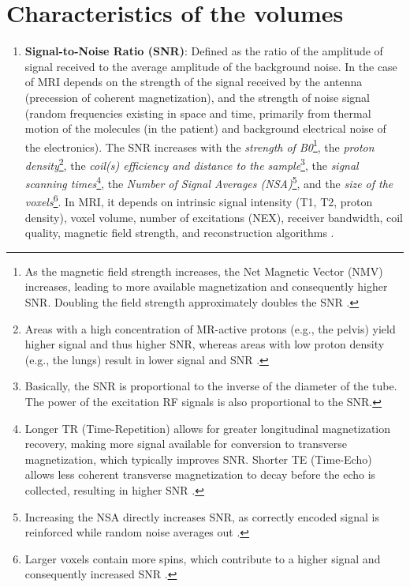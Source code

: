 \section{Characteristics of the volumes}
\begin{enumerate}
\item \textbf{Signal-to-Noise Ratio (SNR)}: Defined as the ratio of
  the amplitude of signal received to the average amplitude of the
  background noise. In the case of MRI depends on the strength of the
  signal received by the antenna (precession of coherent
  magnetization), and the strength of noise signal (random frequencies
  existing in space and time, primarily from thermal motion of the
  molecules (in the patient) and background electrical noise of the
  electronics). The SNR increases with the \emph{strength of
    B0}\footnote{As the magnetic field strength increases, the Net
    Magnetic Vector (NMV) increases, leading to more available
    magnetization and consequently higher SNR. Doubling the field
    strength approximately doubles the SNR \cite{westbrook2018mri}.},
  the \emph{proton density}\footnote{Areas with a high concentration
    of MR-active protons (e.g., the pelvis) yield higher signal and
    thus higher SNR, whereas areas with low proton density (e.g., the
    lungs) result in lower signal and SNR \cite{westbrook2018mri}.},
  the \emph{coil(s) efficiency and distance to the
    sample}\footnote{Basically, the SNR is proportional to the inverse
    of the diameter of the tube. The power of the excitation RF
    signals is also proportional to the SNR.}, the \emph{signal
    scanning times}\footnote{Longer TR (Time-Repetition) allows for
    greater longitudinal magnetization recovery, making more signal
    available for conversion to transverse magnetization, which
    typically improves SNR. Shorter TE (Time-Echo) allows less
    coherent transverse magnetization to decay before the echo is
    collected, resulting in higher SNR \cite{westbrook2018mri}.}, the
  \emph{Number of Signal Averages (NSA)}\footnote{Increasing the NSA
    directly increases SNR, as correctly encoded signal is reinforced
    while random noise averages out \cite{westbrook2018mri}.}, and the
  \emph{size of the voxels}\footnote{Larger voxels contain more spins,
    which contribute to a higher signal and consequently increased SNR
    \cite{westbrook2018mri}.}.  In MRI, it depends on intrinsic signal
  intensity (T1, T2, proton density), voxel volume, number of
  excitations (NEX), receiver bandwidth, coil quality, magnetic field
  strength, and reconstruction algorithms \cite{bushberg2011essential}.

\end{enumerate}
